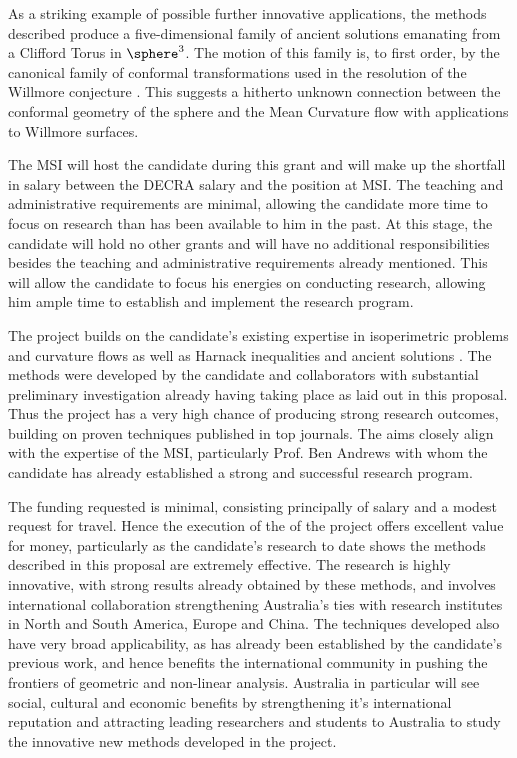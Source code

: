 \documentclass[12pt]{amsart}
\begin{document}
As a striking example of possible further innovative applications, the methods described produce a five-dimensional family of ancient solutions emanating from a Clifford Torus in \(\sphere^3\). The motion of this family is, to first order, by the canonical family of conformal transformations used in the resolution of the Willmore conjecture \cite{MR3152944}. This suggests a hitherto unknown connection between the conformal geometry of the sphere and the Mean Curvature flow with applications to Willmore surfaces.

\smallskip{}
\label{sec:orgheadline15}
The MSI will host the candidate during this grant and will make up the shortfall in salary between the DECRA salary and the position at MSI. The teaching and administrative requirements are minimal, allowing the candidate more time to focus on research than has been available to him in the past. At this stage, the candidate will hold no other grants and will have no additional responsibilities besides the teaching and administrative requirements already mentioned. This will allow the candidate to focus his energies on conducting research, allowing him ample time to establish and implement the research program.

\smallskip{}
\label{sec:orgheadline16}
The project builds on the candidate's existing expertise in isoperimetric problems and curvature flows \cite{Bryan,pbthesis,MR2843240,MR2794630,MR2729306} as well as Harnack inequalities and ancient solutions \cite{BIS4,bryanlouie,2016arXiv160401694B,2015arXiv150802821B,2015arXiv151203374B}. The methods were developed by the candidate and collaborators with substantial preliminary investigation already having taking place as laid out in this proposal. Thus the project has a very high chance of producing strong research outcomes, building on proven techniques published in top journals. The aims closely align with the expertise of the MSI, particularly Prof. Ben Andrews with whom the candidate has already established a strong and successful research program.

\smallskip{}
\label{sec:orgheadline17}
The funding requested is minimal, consisting principally of salary and a modest request for travel. Hence the execution of the of the project offers excellent value for money, particularly as the candidate's research to date shows the methods described in this proposal are extremely effective. The research is highly innovative, with strong results already obtained by these methods, and involves international collaboration strengthening Australia's ties with research institutes in North and South America, Europe and China. The techniques developed also have very broad applicability, as has already been established by the candidate's previous work, and hence benefits the international community in pushing the frontiers of geometric and non-linear analysis. Australia in particular will see social, cultural and economic benefits by strengthening it's international reputation and attracting leading researchers and students to Australia to study the innovative new methods developed in the project.
\end{document}
